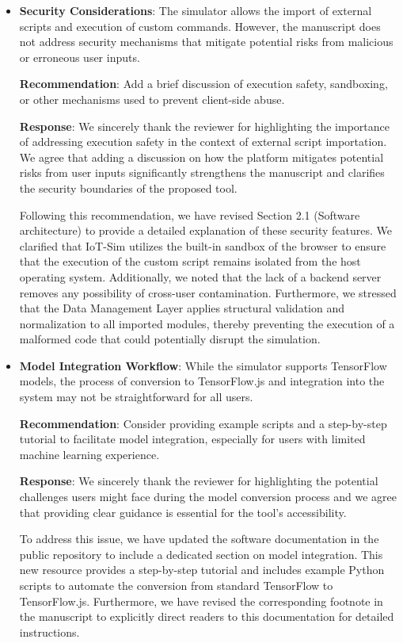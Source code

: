 \documentclass[12pt, a4paper]{article}
\begin{document}
\begin{itemize}
    \item \textbf{Security Considerations}: The simulator allows the import of external scripts and execution of custom commands. However, the manuscript does not address security mechanisms that mitigate potential risks from malicious or erroneous user inputs. 
    
    \textbf{Recommendation}: Add a brief discussion of execution safety, sandboxing, or other mechanisms used to prevent client-side abuse.
    
    {\color{blue}
        \textbf{Response}: We sincerely thank the reviewer for highlighting the importance of addressing execution safety in the context of external script importation. We agree that adding a discussion on how the platform mitigates potential risks from user inputs significantly strengthens the manuscript and clarifies the security boundaries of the proposed tool.

        Following this recommendation, we have revised Section 2.1 (Software architecture) to provide a detailed explanation of these security features. We clarified that IoT-Sim utilizes the built-in sandbox of the browser to ensure that the execution of the custom script remains isolated from the host operating system. Additionally, we noted that the lack of a backend server removes any possibility of cross-user contamination. Furthermore, we stressed that the Data Management Layer applies structural validation and normalization to all imported modules, thereby preventing the execution of a malformed code that could potentially disrupt the simulation.
    }
    
    \item \textbf{Model Integration Workflow}: While the simulator supports TensorFlow models, the process of conversion to TensorFlow.js and integration into the system may not be straightforward for all users.
    
    \textbf{Recommendation}: Consider providing example scripts and a step-by-step tutorial to facilitate model integration, especially for users with limited machine learning experience.
    
    {\color{blue}
        \textbf{Response}: We sincerely thank the reviewer for highlighting the potential challenges users might face during the model conversion process and we agree that providing clear guidance is essential for the tool's accessibility.
        
        To address this issue, we have updated the software documentation in the public repository to include a dedicated section on model integration. This new resource provides a step-by-step tutorial and includes example Python scripts to automate the conversion from standard TensorFlow to TensorFlow.js. Furthermore, we have revised the corresponding footnote in the manuscript to explicitly direct readers to this documentation for detailed instructions.
    }
    

\end{itemize}
\end{document}
